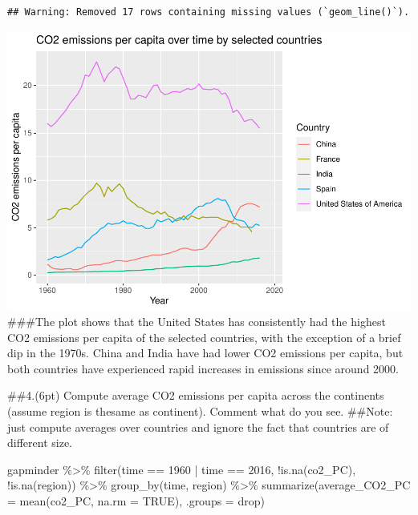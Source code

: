 \documentclass[
]{article}
\newenvironment{Shaded}{\begin{snugshade}}{\end{snugshade}}
\newcommand{\AttributeTok}[1]{\textcolor[rgb]{0.77,0.63,0.00}{#1}}
\newcommand{\ConstantTok}[1]{\textcolor[rgb]{0.00,0.00,0.00}{#1}}
\newcommand{\DecValTok}[1]{\textcolor[rgb]{0.00,0.00,0.81}{#1}}
\newcommand{\FunctionTok}[1]{\textcolor[rgb]{0.00,0.00,0.00}{#1}}
\newcommand{\NormalTok}[1]{#1}
\newcommand{\SpecialCharTok}[1]{\textcolor[rgb]{0.00,0.00,0.00}{#1}}
\newcommand{\StringTok}[1]{\textcolor[rgb]{0.31,0.60,0.02}{#1}}
\begin{document}
\begin{verbatim}
## Warning: Removed 17 rows containing missing values (`geom_line()`).
\end{verbatim}

\includegraphics{ps05-rmarkdown_files/figure-latex/unnamed-chunk-10-1.pdf}
\#\#\#The plot shows that the United States has consistently had the
highest CO2 emissions per capita of the selected countries, with the
exception of a brief dip in the 1970s. China and India have had lower
CO2 emissions per capita, but both countries have experienced rapid
increases in emissions since around 2000.

\#\#4.(6pt) Compute average CO2 emissions per capita across the
continents (assume region is thesame as continent). Comment what do you
see. \#\#Note: just compute averages over countries and ignore the fact
that countries are of different size.

\begin{Shaded}
\begin{Highlighting}[]
\NormalTok{gapminder }\SpecialCharTok{\%\textgreater{}\%} 
  \FunctionTok{filter}\NormalTok{(time }\SpecialCharTok{==} \DecValTok{1960} \SpecialCharTok{|}\NormalTok{ time }\SpecialCharTok{==} \DecValTok{2016}\NormalTok{, }\SpecialCharTok{!}\FunctionTok{is.na}\NormalTok{(co2\_PC), }\SpecialCharTok{!}\FunctionTok{is.na}\NormalTok{(region)) }\SpecialCharTok{\%\textgreater{}\%}
  \FunctionTok{group\_by}\NormalTok{(time, region) }\SpecialCharTok{\%\textgreater{}\%} 
  \FunctionTok{summarize}\NormalTok{(}\AttributeTok{average\_CO2\_PC =} \FunctionTok{mean}\NormalTok{(co2\_PC, }\AttributeTok{na.rm =} \ConstantTok{TRUE}\NormalTok{), }\AttributeTok{.groups =} \StringTok{\textquotesingle{}drop\textquotesingle{}}\NormalTok{) }
\end{Highlighting}
\end{Shaded}
\end{document}
